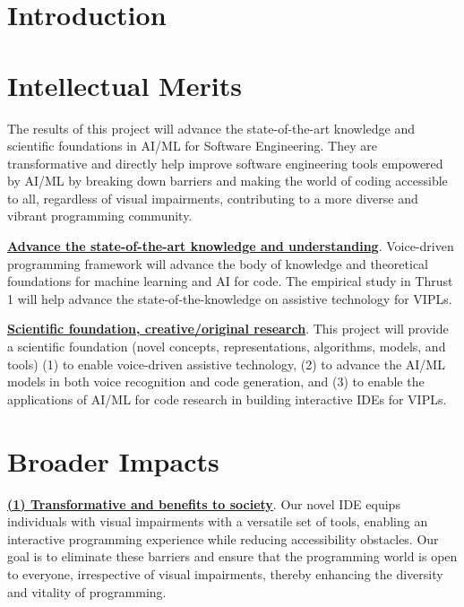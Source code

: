 \section{Introduction}\label{sec:intro}



%





\section{Intellectual Merits}

The results of this project will advance the state-of-the-art
knowledge and scientific foundations in AI/ML for Software
Engineering. They are transformative and directly help improve
software engineering tools empowered by AI/ML by breaking down
barriers and making the world of coding accessible to all, regardless
of visual impairments, contributing to a more diverse and vibrant
programming community.

\noindent \underline{{\bf Advance the state-of-the-art knowledge and
    understanding}}. Voice-driven programming framework will advance
the body of knowledge and theoretical foundations for machine learning
and AI for code. The empirical study in Thrust 1 will help advance the
state-of-the-knowledge on assistive technology for VIPLs.

\noindent \underline{{\bf Scientific foundation, creative/original
    research}}. This project will provide a scientific foundation
(novel concepts, representations, algorithms, models, and tools) (1)
to enable voice-driven assistive technology, (2) to advance the AI/ML
models in both voice recognition and code generation, and (3) to
enable the applications of AI/ML for code research in building
interactive IDEs for VIPLs.

\section{Broader Impacts}

\underline{{\bf (1) Transformative and benefits to society}}.  Our
novel IDE equips individuals with visual
impairments with a versatile set of tools,
enabling an interactive programming experience while reducing
accessibility obstacles. Our goal is to eliminate these barriers and
ensure that the programming world is open to everyone, irrespective of
visual impairments, thereby enhancing the diversity and vitality of
programming.


